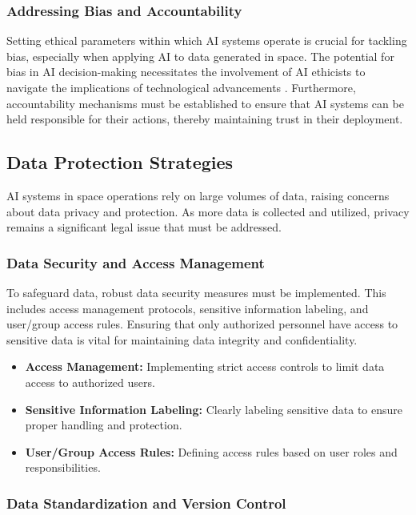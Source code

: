 \documentclass[a4paper, 11pt]{article}
\begin{document}
\subsubsection{Addressing Bias and Accountability}

Setting ethical parameters within which AI systems operate is crucial for tackling bias, especially when applying AI to data generated in space. The potential for bias in AI decision-making necessitates the involvement of AI ethicists to navigate the implications of technological advancements \cite{researchers_on_ai_ethics}. Furthermore, accountability mechanisms must be established to ensure that AI systems can be held responsible for their actions, thereby maintaining trust in their deployment.

\subsection{Data Protection Strategies}

AI systems in space operations rely on large volumes of data, raising concerns about data privacy and protection. As more data is collected and utilized, privacy remains a significant legal issue that must be addressed.

\subsubsection{Data Security and Access Management}

To safeguard data, robust data security measures must be implemented. This includes access management protocols, sensitive information labeling, and user/group access rules. Ensuring that only authorized personnel have access to sensitive data is vital for maintaining data integrity and confidentiality.

\begin{itemize}
    \item \textbf{Access Management:} Implementing strict access controls to limit data access to authorized users.
    \item \textbf{Sensitive Information Labeling:} Clearly labeling sensitive data to ensure proper handling and protection.
    \item \textbf{User/Group Access Rules:} Defining access rules based on user roles and responsibilities.
\end{itemize}

\subsubsection{Data Standardization and Version Control}
\end{document}
